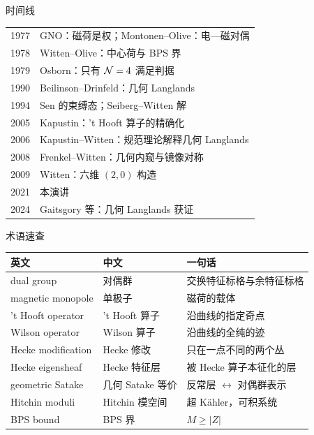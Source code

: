 \begin{frame}{时间线}
  \begin{center}
  \renewcommand{\arraystretch}{1.15}
  \small
  \begin{tabular}{@{}rl@{}}
    \toprule
    1977 & GNO：磁荷是权；Montonen--Olive：电—磁对偶 \\
    1978 & Witten--Olive：中心荷与 BPS 界 \\
    1979 & Osborn：只有 $\mathcal{N}=4$ 满足判据 \\
    1990 & Beilinson--Drinfeld：几何 Langlands \\
    1994 & Sen 的束缚态；Seiberg--Witten 解 \\
    2005 & Kapustin：'t Hooft 算子的精确化 \\
    2006 & Kapustin--Witten：规范理论解释几何 Langlands \\
    2008 & Frenkel--Witten：几何内窥与镜像对称 \\
    2009 & Witten：六维 $(2,0)$ 构造 \\
    2021 & 本演讲 \\
    2024 & Gaitsgory 等：几何 Langlands 获证 \\
    \bottomrule
  \end{tabular}
  \end{center}
\end{frame}

\begin{frame}{术语速查}
  \begin{center}
  \renewcommand{\arraystretch}{1.15}
  \small
  \begin{tabular}{@{}lll@{}}
    \toprule
    英文 & 中文 & 一句话 \\
    \midrule
    dual group & 对偶群 & 交换特征标格与余特征标格 \\
    magnetic monopole & 单极子 & 磁荷的载体 \\
    't Hooft operator & 't Hooft 算子 & 沿曲线的指定奇点 \\
    Wilson operator & Wilson 算子 & 沿曲线的全纯的迹 \\
    Hecke modification & Hecke 修改 & 只在一点不同的两个丛 \\
    Hecke eigensheaf & Hecke 特征层 & 被 Hecke 算子本征化的层 \\
    geometric Satake & 几何 Satake 等价 & 反常层 $\leftrightarrow$ 对偶群表示 \\
    Hitchin moduli & Hitchin 模空间 & 超 Kähler，可积系统 \\
    BPS bound & BPS 界 & $M\ge|Z|$ \\
    \bottomrule
  \end{tabular}
  \end{center}
\end{frame}

